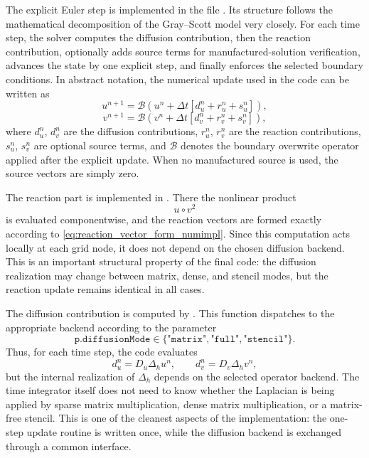 The explicit Euler step is implemented in the file . Its structure follows the mathematical decomposition of the Gray--Scott model very closely. For each time step, the solver computes the diffusion contribution, then the reaction contribution, optionally adds source terms for manufactured-solution verification, advances the state by one explicit step, and finally enforces the selected boundary conditions. In abstract notation, the numerical update used in the code can be written as
\begin{equation}
u^{n+1}
=
\mathcal{B}\!\left(
u^n + \Delta t \left[d_u^n + r_u^n + s_u^n\right]
\right),
\label{eq:update_with_bc_u_numimpl}
\end{equation}
\begin{equation}
v^{n+1}
=
\mathcal{B}\!\left(
v^n + \Delta t \left[d_v^n + r_v^n + s_v^n\right]
\right),
\label{eq:update_with_bc_v_numimpl}
\end{equation}
where $d_u^n$, $d_v^n$ are the diffusion contributions, $r_u^n$, $r_v^n$ are the reaction contributions, $s_u^n$, $s_v^n$ are optional source terms, and $\mathcal{B}$ denotes the boundary overwrite operator applied after the explicit update. When no manufactured source is used, the source vectors are simply zero.

The reaction part is implemented in . There the nonlinear product
\[
u \circ v^2
\]
is evaluated componentwise, and the reaction vectors are formed exactly according to \eqref{eq:reaction_vector_form_numimpl}. Since this computation acts locally at each grid node, it does not depend on the chosen diffusion backend. This is an important structural property of the final code: the diffusion realization may change between matrix, dense, and stencil modes, but the reaction update remains identical in all cases.

The diffusion contribution is computed by . This function dispatches to the appropriate backend according to the parameter
\[
\texttt{p.diffusionMode} \in \{\texttt{"matrix"},\texttt{"full"},\texttt{"stencil"}\}.
\]
Thus, for each time step, the code evaluates
\[
d_u^n = D_u \Delta_h u^n,
\qquad
d_v^n = D_v \Delta_h v^n,
\]
but the internal realization of $\Delta_h$ depends on the selected operator backend. The time integrator itself does not need to know whether the Laplacian is being applied by sparse matrix multiplication, dense matrix multiplication, or a matrix-free stencil. This is one of the cleanest aspects of the implementation: the one-step update routine is written once, while the diffusion backend is exchanged through a common interface.

